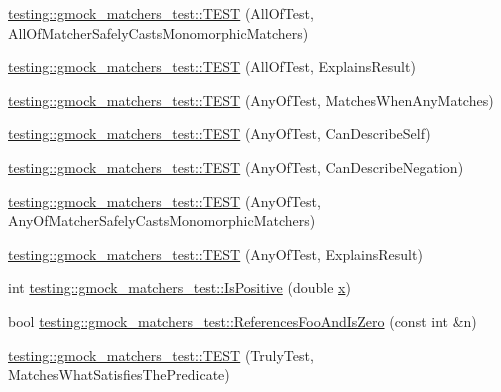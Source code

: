 \begin{DoxyCompactItemize}
\item 
\mbox{\hyperlink{namespacetesting_1_1gmock__matchers__test_a4196a4000390e2378954d55b4f6d2893}{testing\+::gmock\+\_\+matchers\+\_\+test\+::\+T\+E\+ST}} (All\+Of\+Test, All\+Of\+Matcher\+Safely\+Casts\+Monomorphic\+Matchers)
\item 
\mbox{\hyperlink{namespacetesting_1_1gmock__matchers__test_a2b9f4a791dd4f1fb9f8a1400883a5db4}{testing\+::gmock\+\_\+matchers\+\_\+test\+::\+T\+E\+ST}} (All\+Of\+Test, Explains\+Result)
\item 
\mbox{\hyperlink{namespacetesting_1_1gmock__matchers__test_a4949d40a1ac77182274189c21848af00}{testing\+::gmock\+\_\+matchers\+\_\+test\+::\+T\+E\+ST}} (Any\+Of\+Test, Matches\+When\+Any\+Matches)
\item 
\mbox{\hyperlink{namespacetesting_1_1gmock__matchers__test_a00bd490bf974b3f3485a1b0fde9fa490}{testing\+::gmock\+\_\+matchers\+\_\+test\+::\+T\+E\+ST}} (Any\+Of\+Test, Can\+Describe\+Self)
\item 
\mbox{\hyperlink{namespacetesting_1_1gmock__matchers__test_acc5e849e0765f00a48581e9480f3c8e2}{testing\+::gmock\+\_\+matchers\+\_\+test\+::\+T\+E\+ST}} (Any\+Of\+Test, Can\+Describe\+Negation)
\item 
\mbox{\hyperlink{namespacetesting_1_1gmock__matchers__test_a8fb1598253450afeb0440682cd23999e}{testing\+::gmock\+\_\+matchers\+\_\+test\+::\+T\+E\+ST}} (Any\+Of\+Test, Any\+Of\+Matcher\+Safely\+Casts\+Monomorphic\+Matchers)
\item 
\mbox{\hyperlink{namespacetesting_1_1gmock__matchers__test_ad4c09014fce6029575e2c337cde85bdf}{testing\+::gmock\+\_\+matchers\+\_\+test\+::\+T\+E\+ST}} (Any\+Of\+Test, Explains\+Result)
\item 
int \mbox{\hyperlink{namespacetesting_1_1gmock__matchers__test_a70e728cf67d0224c3ebb9eb8959cc39d}{testing\+::gmock\+\_\+matchers\+\_\+test\+::\+Is\+Positive}} (double \mbox{\hyperlink{_obj__test_2lib_2googletest-master_2googlemock_2test_2gmock-matchers__test_8cc_a6150e0515f7202e2fb518f7206ed97dc}{x}})
\item 
bool \mbox{\hyperlink{namespacetesting_1_1gmock__matchers__test_abdce9daf2e3d3721d68f76680129f03b}{testing\+::gmock\+\_\+matchers\+\_\+test\+::\+References\+Foo\+And\+Is\+Zero}} (const int \&n)
\item 
\mbox{\hyperlink{namespacetesting_1_1gmock__matchers__test_ab7761562a8ffea67a485f3f649f6430a}{testing\+::gmock\+\_\+matchers\+\_\+test\+::\+T\+E\+ST}} (Truly\+Test, Matches\+What\+Satisfies\+The\+Predicate)
\item 

\end{DoxyCompactItemize}

